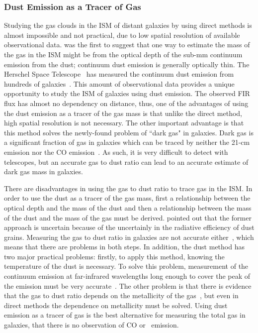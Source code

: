 \subsubsection{Dust Emission as a Tracer of Gas} 

Studying the gas clouds in the ISM of distant galaxies by using direct methods is almost impossible and not practical, due to low spatial resolution of available observational data.
\cite{Hildebran83} was the first to suggest that one way to estimate the mass of the gas in the ISM might be from the optical depth of the sub-mm continuum emission from the dust; continuum dust emission is generally optically thin. 
The Herschel Space Telescope~\citep{Pilbratt10} has measured the continuum dust emission from hundreds of galaxies~\citep{Eales10, Oliver12}. 
This amount of observational data provides a unique opportunity to study the ISM of galaxies using dust emission. 
The observed FIR flux has almost no dependency on distance, thus, one of the advantages of using the dust emission as a tracer of the gas mass is that unlike the direct method, high spatial resolution is not necessary. 
The other important advantage is that this method solves the newly-found problem of ``dark gas" in galaxies. 
Dark gas is a significant fraction of gas in galaxies which can be traced by neither the 21-cm emission nor the CO emission~\citep{Abdo10}. 
As such, it is very difficult to detect with telescopes, but an accurate gas to dust ratio can lead to an accurate estimate of dark gas mass in galaxies. 

There are disadvantages in using the gas to dust ratio to trace gas in the ISM.
In order to use the dust as a tracer of the gas mass, first a relationship between the optical depth and the mass of the dust and then a relationship between the mass of the dust and the mass of the gas must be derived.
\cite{Draine03} pointed out that the former approach is uncertain because of the uncertainly in the radiative efficiency of dust grains. 
Measuring the gas to dust ratio in galaxies are not accurate either~\citep{Hildebran83}, which means that there are problems in both steps. 
In addition, the dust method has two major practical problems: firstly, to apply this method, knowing the temperature of the dust is necessary. 
To solve this problem, measurement of the continuum emission at far-infrared wavelengths long enough to cover the peak of the emission must be very accurate~\citep{Ealas12}. 
The other problem is that there is evidence that the gas to dust ratio depends on the metallicity of the gas~\citep{Lisenfeld98, Draine07}, but even in direct methods the dependence on metallicity must be solved. 
Using dust emission as a tracer of gas is the best alternative for measuring the total gas in galaxies, that there is no observation of CO or \hi~emission. 

